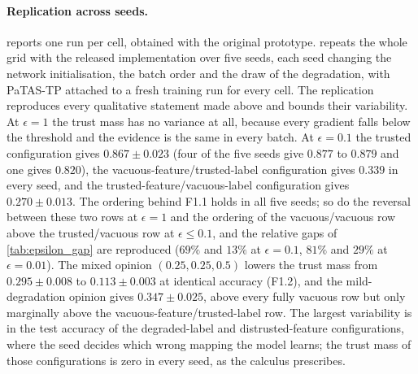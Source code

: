 \paragraph*{Replication across seeds.}  reports one run per cell, obtained with the original prototype.  repeats the whole grid with the released implementation over five seeds, each seed changing the network initialisation, the batch order and the draw of the degradation, with \ac{PaTAS-TP} attached to a fresh training run for every cell. The replication reproduces every qualitative statement made above and bounds their variability. At $\epsilon = 1$ the trust mass has no variance at all, because every gradient falls below the threshold and the evidence is the same in every batch. At $\epsilon = 0.1$ the trusted configuration gives $0.867 \pm 0.023$ (four of the five seeds give $0.877$ to $0.879$ and one gives $0.820$), the vacuous-feature/trusted-label configuration gives $0.339$ in every seed, and the trusted-feature/vacuous-label configuration gives $0.270 \pm 0.013$. The ordering behind F1.1 holds in all five seeds; so do the reversal between these two rows at $\epsilon = 1$ and the ordering of the vacuous/vacuous row above the trusted/vacuous row at $\epsilon \le 0.1$, and the relative gaps of \cref{tab:epsilon_gap} are reproduced ($69\%$ and $13\%$ at $\epsilon = 0.1$, $81\%$ and $29\%$ at $\epsilon = 0.01$). The mixed opinion $(0.25, 0.25, 0.5)$ lowers the trust mass from $0.295 \pm 0.008$ to $0.113 \pm 0.003$ at identical accuracy (F1.2), and the mild-degradation opinion gives $0.347 \pm 0.025$, above every fully vacuous row but only marginally above the vacuous-feature/trusted-label row. The largest variability is in the test accuracy of the degraded-label and distrusted-feature configurations, where the seed decides which wrong mapping the model learns; the trust mass of those configurations is zero in every seed, as the calculus prescribes.

